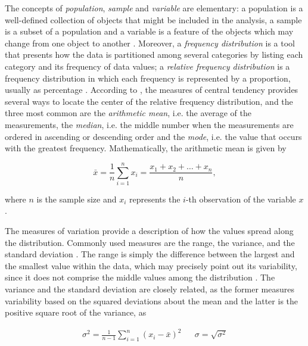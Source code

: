 The concepts of \emph{population}, \emph{sample} and \emph{variable} are elementary: a population is a well-defined collection of objects that might be included in the analysis, a sample is a subset of a population and a variable is a feature of the objects which may change from one object to another \cite{devore2011probability}. Moreover, a \emph{frequency distribution} is a tool that presents how the data is partitioned among several categories by listing each category and its frequency of data values; a \emph{relative frequency distribution} is a frequency distribution in which each frequency is represented by a proportion, usually as percentage \cite{triola2017elementary}. According to , the measures of central tendency provides several ways to locate the center of the relative frequency distribution, and the three most common are the \emph{arithmetic mean}, i.e. the average of the measurements, the \emph{median}, i.e. the middle number when the measurements are ordered in ascending or descending order and the \emph{mode}, i.e. the value that occurs with the greatest frequency. Mathematically, the arithmetic mean is given by

\begin{equation}
\label{eqn:arithmetic_mean}
\bar{x} = \frac{1}{n} \sum_{i=1}^{n} x_{i} = \frac{x_{1} + x_{2} + \dots + x_{n}}{n},
\end{equation}

\noindent where $n$ is the sample size and $x_{i}$ represents the $i$-th observation of the variable $x$ \cite{zwillinger1999crc}.


The measures of variation provide a description of how the values spread along the distribution. Commonly used measures are the range, the variance, and the standard deviation \cite{mendenhall2016statistics}. The range is simply the difference between the largest and the smallest value within the data, which may precisely point out its variability, since it does not comprise the middle values among the distribution \cite{devore2011probability}. The variance and the standard deviation are closely related, as the former measures variability based on the squared deviations about
the mean and the latter is the positive square root of the variance, as

\begin{align}
\label{eqn:variance_std}
\sigma^{2} = \frac{1}{n - 1} \sum_{i = 1}^{n} \left(x_{i} - \bar{x}\right)^{2}
&&
\sigma = \sqrt{\sigma^{2}}
\end{align}

